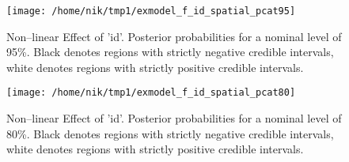 \documentclass[a4paper, 12pt]{article}
\begin{document}
\begin{figure}[htb]
\centering
\texttt{[image: /home/nik/tmp1/exmodel\_f\_id\_spatial\_pcat95]}
\caption{Non--linear Effect of 'id'. Posterior probabilities for a nominal level of 95\%.
Black denotes regions with strictly negative credible intervals,
white denotes regions with strictly positive credible intervals.}
\end{figure}

\begin{figure}[htb]
\centering
\texttt{[image: /home/nik/tmp1/exmodel\_f\_id\_spatial\_pcat80]}
\caption{Non--linear Effect of 'id'. Posterior probabilities for a nominal level of 80\%.
Black denotes regions with strictly negative credible intervals,
white denotes regions with strictly positive credible intervals.}
\end{figure}
\end{document}
